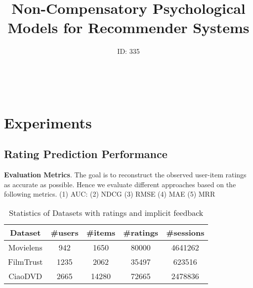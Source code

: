 \documentclass[letterpaper]{article} %
\begin{document}
%
\title{Non-Compensatory Psychological Models for Recommender Systems}
\author{ID: 335
}
\maketitle
\

\section{Experiments}\label{sec:experiment}
\subsection{Rating Prediction Performance}
\textbf{Evaluation Metrics}.  The goal is to reconstruct the observed user-item ratings as accurate as possible. Hence we evaluate different approaches based on the following metrics. (1) AUC: (2) NDCG (3) RMSE (4) MAE (5) MRR


\begin{table}[htp]
\caption{Statistics of Datasets with ratings and implicit feedback}
\begin{center}
\begin{tabular}{|c|c|c|c|c|}
\hline
Dataset & \#users & \#items & \#ratings & \#sessions \\\hline
Movielens &942 &1650 &80000 &4641262 \\\hline
FilmTrust &1235 &2062 &35497 &623516 \\\hline
CiaoDVD &2665 &14280 &72665 &2478836 \\\hline
\end{tabular}
\end{center}
\label{tab:datasets}
\end{table}%
\end{document}
